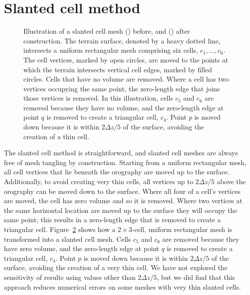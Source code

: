 \section{Slanted cell method}
\label{sec:slanted:method}

\begin{figure}
\centering
\begin{subfigure}{\textwidth}
	\centering
	
	\label{fig:slanted:construct-mesh:before}
	\label{fig:slanted:construct-mesh:after}
\end{subfigure}
\caption{Illustration of a slanted cell mesh
() before, and
() after construction.
	The terrain surface, denoted by a heavy dotted line, intersects a uniform rectangular mesh comprising six cells, $c_1, \ldots, c_6$.
	The cell vertices, marked by open circles, are moved to the points at which the terrain intersects vertical cell edges, marked by filled circles.  Cells that have no volume are removed.  Where a cell has two vertices occupying the same point, the zero-length edge that joins those vertices is removed.
	In this illustration, cells $c_5$ and $c_6$ are removed because they have no volume, and the zero-length edge at point $q$ is removed to create a triangular cell, $c_4$.
	Point $p$ is moved down because it is within $2 \Delta z/5$ of the surface, avoiding the creation of a thin cell.}
\label{fig:slanted:construct-mesh}
\end{figure}

The slanted cell method is straightforward, and slanted cell meshes are always free of mesh tangling by construction.
Starting from a uniform rectangular mesh, all cell vertices that lie beneath the orography are moved up to the surface.
Additionally, to avoid creating very thin cells, all vertices up to $2 \Delta z/5$ above the orography can be moved down to the surface.
Where all four of a cell's vertices are moved, the cell has zero volume and so it is removed.  Where two vertices at the same horizontal location are moved up to the surface they will occupy the same point; this results in a zero-length edge that is removed to create a triangular cell.
Figure~\ref{fig:slanted:construct-mesh} shows how a $2 \times 3$-cell, uniform rectangular mesh is transformed into a slanted cell mesh.  Cells $c_5$ and $c_6$ are removed because they have zero volume, and the zero-length edge at point $q$ is removed to create a triangular cell, $c_4$.
Point $p$ is moved down because it is within $2\Delta z/5$ of the surface, avoiding the creation of a very thin cell.
We have not explored the sensitivity of results using values other than $2\Delta z/5$, but we did find that this approach reduces numerical errors on some meshes with very thin slanted cells.

